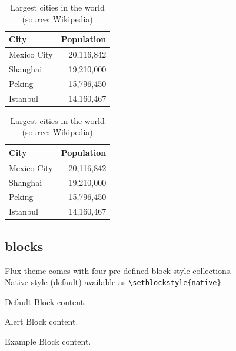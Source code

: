 \documentclass[9pt,aspectratio=169]{ctexbeamer}
\begin{document}
\begin{frame}{\secname}{\subsecname}
  \begin{table}
    \caption{Largest cities in the world (source: Wikipedia)}
    \begin{tabular}{@{} lr @{}}
      \toprule
      City & Population\\
      \midrule
      Mexico City & 20,116,842\\
      Shanghai & 19,210,000\\
      Peking & 15,796,450\\
      Istanbul & 14,160,467\\
      \bottomrule
    \end{tabular}
    \hspace*{1cm}
        \setlength\extrarowheight{3pt}
    \begin{tabular}{|lr|}
      \hline
      \rowcolor{primaryLight}\color{background}City & \color{background}Population\\
      \hline
      Mexico City & 20,116,842\\
      Shanghai & 19,210,000\\
      Peking & 15,796,450\\
      Istanbul & 14,160,467\\
      \hline
    \end{tabular}
\end{table}
\end{frame}

\subsection{blocks}

\begin{frame}[fragile]{\secname}{\subsecname}
  		Flux theme comes with four pre-defined block style collections.\\
  		Native style (default) available as \verb+\setblockstyle{native}+\\[0.5cm]
  
   \centering
	\begin{minipage}[b]{0.5\textwidth}

	  \begin{block}{Default}
        Block content.
      \end{block}

      \begin{alertblock}{Alert}
        Block content.
      \end{alertblock}

      \begin{exampleblock}{Example}
        Block content.
      \end{exampleblock}      
      
	\end{minipage}
	
\end{frame}
\end{document}
